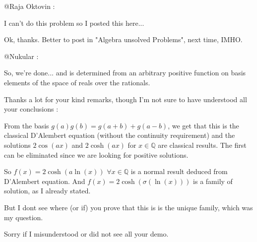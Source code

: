 \begin{solution}
	@Raja Oktovin :
\begin{tcolorbox}I can't do this problem so I posted this here...
\end{tcolorbox}
Ok, thanks. Better to post in "Algebra unsolved Problems", next time, IMHO.

@Nukular :
\begin{tcolorbox}So, we're done... and  is determined from an arbitrary positive function on basis elements of the space of reals over the rationals. 
\end{tcolorbox}

Thanks a lot for your kind remarks, though I'm not sure to have understood all your conclusions :

From the basis $ g(a)g(b)=g(a+b)+g(a-b)$, we get that this is the classical D'Alembert equation (without the continuity requirement) and the solutions $ 2\cos(ax)$ and $ 2\cosh(ax)$ for $ x\in\mathbb Q$ are classical results. The first can be eliminated since we are looking for positive solutions.

So $ f(x)=2\cosh(a\ln(x))$ $ \forall x\in\mathbb Q$ is a normal result deduced from D'Alembert equation.
And $ f(x)=2\cosh(\sigma(\ln(x)))$ is a family of solution, as I already stated.

But I dont see where (or if) you prove that this is is the unique family, which was my question.

Sorry if I misunderstood or did not see all your demo.
\end{solution}



